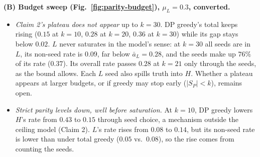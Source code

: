 \textbf{(B) Budget sweep (Fig.~\ref{fig:parity-budget}), $\mu_L=0.3$, converted.}
\begin{itemize}
\item \emph{Claim 2's plateau does not appear} up to $k=30$. DP greedy's total keeps rising ($0.15$ at $k=10$, $0.28$ at $k=20$, $0.36$ at $k=30$) while its gap stays below $0.02$. $L$ never saturates in the model's sense: at $k=30$ all seeds are in $L$, its non-seed rate is $0.09$, far below $\bar a_L=0.28$, and the seeds make up $76\%$ of its rate ($0.37$). Its overall rate passes $0.28$ at $k=21$ only through the seeds, as the bound allows. Each $L$ seed also spills truth into $H$. Whether a plateau appears at larger budgets, or if greedy may stop early ($|S_P|<k$), remains open.
\item \emph{Strict parity levels down, well before saturation.} At $k=10$, DP greedy lowers $H$'s rate from $0.43$ to $0.15$ through seed choice, a mechanism outside the ceiling model (Claim 2). $L$'s rate rises from $0.08$ to $0.14$, but its non-seed rate is lower than under total greedy ($0.05$ vs.\ $0.08$), so the rise comes from counting the seeds.
\end{itemize}

